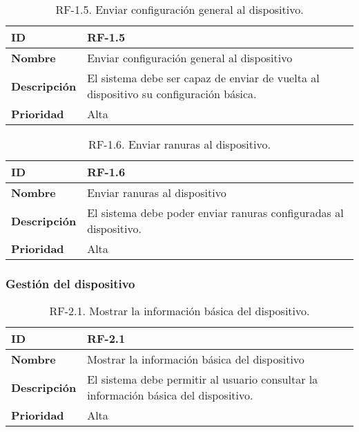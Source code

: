 \begin{table}[h!]
    \centering
    \begin{tabular}{|m{2.5cm}|m{9.27cm}|}
        \hline
        \textbf{ID} & RF-1.5 \\
        \hline
        \textbf{Nombre} & Enviar configuración general al dispositivo \\
        \hline
        \textbf{Descripción} & El sistema debe ser capaz de enviar de vuelta al dispositivo su configuración básica. \\
        \hline
        \textbf{Prioridad} & Alta \\
        \hline
    \end{tabular}
    \caption{RF-1.5. Enviar configuración general al dispositivo.}
\end{table}

\begin{table}[h!]
    \centering
    \begin{tabular}{|m{2.5cm}|m{9.27cm}|}
        \hline
        \textbf{ID} & RF-1.6 \\
        \hline
        \textbf{Nombre} & Enviar ranuras al dispositivo \\
        \hline
        \textbf{Descripción} & El sistema debe poder enviar ranuras configuradas al dispositivo. \\
        \hline
        \textbf{Prioridad} & Alta \\
        \hline
    \end{tabular}
    \caption{RF-1.6. Enviar ranuras al dispositivo.}
\end{table}

\subsubsection{Gestión del dispositivo}

\begin{table}[h!]
    \centering
    \begin{tabular}{|m{2.5cm}|m{9.27cm}|}
        \hline
        \textbf{ID} & RF-2.1 \\
        \hline
        \textbf{Nombre} & Mostrar la información básica del dispositivo \\
        \hline
        \textbf{Descripción} & El sistema debe permitir al usuario consultar la información básica del dispositivo. \\
        \hline
        \textbf{Prioridad} & Alta \\
        \hline
    \end{tabular}
    \caption{RF-2.1. Mostrar la información básica del dispositivo.}
\end{table}

